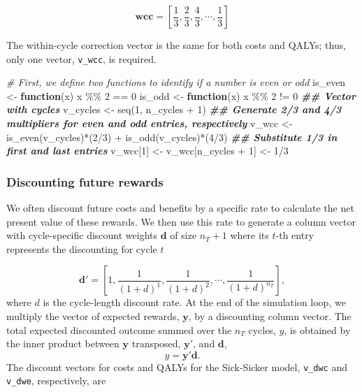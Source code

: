 \documentclass[
]{article}
\newenvironment{Shaded}{\begin{snugshade}}{\end{snugshade}}
\newcommand{\CommentTok}[1]{\textcolor[rgb]{0.56,0.35,0.01}{\textit{#1}}}
\newcommand{\ControlFlowTok}[1]{\textcolor[rgb]{0.13,0.29,0.53}{\textbf{#1}}}
\newcommand{\DecValTok}[1]{\textcolor[rgb]{0.00,0.00,0.81}{#1}}
\newcommand{\DocumentationTok}[1]{\textcolor[rgb]{0.56,0.35,0.01}{\textbf{\textit{#1}}}}
\newcommand{\FunctionTok}[1]{\textcolor[rgb]{0.00,0.00,0.00}{#1}}
\newcommand{\NormalTok}[1]{#1}
\newcommand{\OtherTok}[1]{\textcolor[rgb]{0.56,0.35,0.01}{#1}}
\newcommand{\SpecialCharTok}[1]{\textcolor[rgb]{0.00,0.00,0.00}{#1}}
\begin{document}
\[
  \mathbf{wcc} = \left[\frac{1}{3}, \frac{2}{3}, \frac{4}{3}, \cdots, \frac{1}{3}\right]
\]

The within-cycle correction vector is the same for both costs and QALYs; thus, only one vector, \texttt{v\_wcc}, is required.

\begin{Shaded}
\begin{Highlighting}[]
\CommentTok{\# First, we define two functions to identify if a number is even or odd}
\NormalTok{is\_even }\OtherTok{\textless{}{-}} \ControlFlowTok{function}\NormalTok{(x) x }\SpecialCharTok{\%\%} \DecValTok{2} \SpecialCharTok{==} \DecValTok{0}
\NormalTok{is\_odd  }\OtherTok{\textless{}{-}} \ControlFlowTok{function}\NormalTok{(x) x }\SpecialCharTok{\%\%} \DecValTok{2} \SpecialCharTok{!=} \DecValTok{0}
\DocumentationTok{\#\# Vector with cycles}
\NormalTok{v\_cycles }\OtherTok{\textless{}{-}} \FunctionTok{seq}\NormalTok{(}\DecValTok{1}\NormalTok{, n\_cycles }\SpecialCharTok{+} \DecValTok{1}\NormalTok{)}
\DocumentationTok{\#\# Generate 2/3 and 4/3 multipliers for even and odd entries, respectively}
\NormalTok{v\_wcc }\OtherTok{\textless{}{-}} \FunctionTok{is\_even}\NormalTok{(v\_cycles)}\SpecialCharTok{*}\NormalTok{(}\DecValTok{2}\SpecialCharTok{/}\DecValTok{3}\NormalTok{) }\SpecialCharTok{+} \FunctionTok{is\_odd}\NormalTok{(v\_cycles)}\SpecialCharTok{*}\NormalTok{(}\DecValTok{4}\SpecialCharTok{/}\DecValTok{3}\NormalTok{)}
\DocumentationTok{\#\# Substitute 1/3 in first and last entries}
\NormalTok{v\_wcc[}\DecValTok{1}\NormalTok{] }\OtherTok{\textless{}{-}}\NormalTok{ v\_wcc[n\_cycles }\SpecialCharTok{+} \DecValTok{1}\NormalTok{] }\OtherTok{\textless{}{-}} \DecValTok{1}\SpecialCharTok{/}\DecValTok{3}
\end{Highlighting}
\end{Shaded}

\hypertarget{discounting-future-rewards}{%
\subsubsection{Discounting future rewards}\label{discounting-future-rewards}}

We often discount future costs and benefits by a specific rate to calculate the net present value of these rewards. We then use this rate to generate a column vector with cycle-specific discount weights \(\mathbf{d}\) of size \(n_T+1\) where its \(t\)-th entry represents the discounting for cycle \(t\)

\[
  \mathbf{d'} = \left[1, \frac{1}{(1+d)^{1}}, \frac{1}{(1+d)^{2}}, \cdots, \frac{1}{(1+d)^{n_T}}\right],
\]
where \(d\) is the cycle-length discount rate. At the end of the simulation loop, we multiply the vector of expected rewards, \(\mathbf{y}\), by a discounting column vector. The total expected discounted outcome summed over the \(n_T\) cycles, \(y\), is obtained by the inner product between \(\mathbf{y}\) transposed, \(\mathbf{y'}\), and \(\mathbf{d}\),
\begin{equation}
 y = \mathbf{y'} \mathbf{d}.
 \label{eq:tot-exp-disc-rewd}
\end{equation}
The discount vectors for costs and QALYs for the Sick-Sicker model, \texttt{v\_dwc} and \texttt{v\_dwe}, respectively, are
\end{document}
